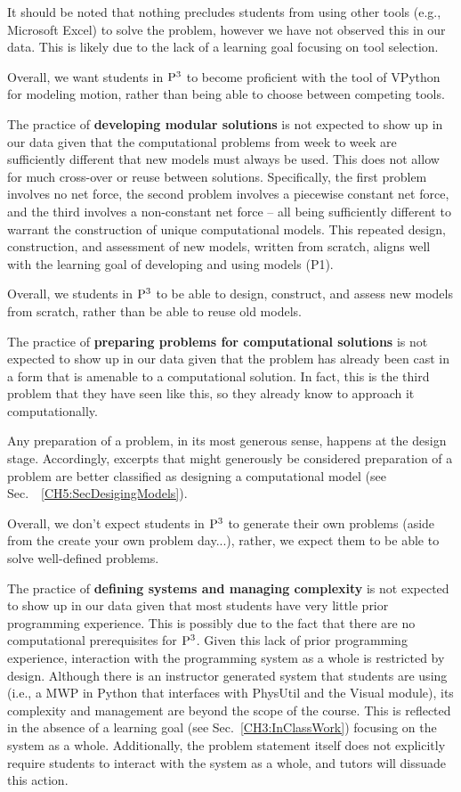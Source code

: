 \documentclass{msuphddissertation}
\begin{document}
\begin{doublespace}
It should be noted that nothing precludes students from using other tools (e.g., Microsoft Excel) to solve the problem, however we have not observed this in our data.  This is likely due to the lack of a learning goal focusing on tool selection.  

Overall, we want students in ${\rm P}^{3}$ to become proficient with the tool of VPython for modeling motion, rather than being able to choose between competing tools.

The practice of \textbf{developing modular solutions} is not expected to show up in our data given that the computational problems from week to week are sufficiently different that new models must always be used.  This does not allow for much cross-over or reuse between solutions.  Specifically, the first problem involves no net force, the second problem involves a piecewise constant net force, and the third involves a non-constant net force -- all being sufficiently different to warrant the construction of unique computational models.  This repeated design, construction, and assessment of new models, written from scratch, aligns well with the learning goal of developing and using models (P1).

Overall, we students in ${\rm P}^{3}$ to be able to design, construct, and assess new models from scratch, rather than be able to reuse old models.

The practice of \textbf{preparing problems for computational solutions} is not expected to show up in our data given that the problem has already been cast in a form that is amenable to a computational solution.  In fact, this is the third problem that they have seen like this, so they already know to approach it computationally.

Any preparation of a problem, in its most generous sense, happens at the design stage.  Accordingly, excerpts that might generously be considered preparation of a problem are better classified as designing a computational model (see Sec.~~\ref{CH5:SecDesigingModels}).

Overall, we don't expect students in ${\rm P}^{3}$ to generate their own problems (aside from the create your own problem day...), rather, we expect them to be able to solve well-defined problems.

The practice of \textbf{defining systems and managing complexity} is not expected to show up in our data given that most students have very little prior programming experience.  This is possibly due to the fact that there are no computational prerequisites for ${\rm P}^{3}$.  Given this lack of prior programming experience, interaction with the programming system as a whole is restricted by design.  Although there is an instructor generated system that students are using (i.e., a MWP in Python that interfaces with PhysUtil and the Visual module), its complexity and management are beyond the scope of the course.  This is reflected in the absence of a learning goal (see Sec.~\ref{CH3:InClassWork}) focusing on the system as a whole.  Additionally, the problem statement itself does not explicitly require students to interact with the system as a whole, and tutors will dissuade this action.


\end{doublespace}
\end{document}
